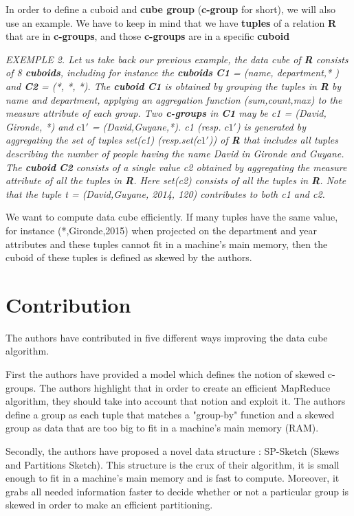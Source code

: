 \documentclass[10pt,journal,compsoc]{IEEEtran}
\begin{document}
In order to define a cuboid and \textbf{cube group} (\textbf{c-group} for short), we will also use an example. We have to keep in mind that we have \textbf{tuples} of a relation \textbf{R} that are in \textbf{c-groups}, and those \textbf{c-groups} are in a specific \textbf{cuboid}

\textit{EXEMPLE 2. Let us take back our previous example, the data cube of \textbf{R} consists of 8 \textbf{cuboids}, including for instance the \textbf{cuboids} \textbf{C1} = (name, department,* ) and \textbf{C2} = (*, *, *). The \textbf{cuboid} \textbf{C1} is obtained by grouping the tuples in \textbf{R} by name
 and department, applying an aggregation function (sum,count,max) to the measure attribute of each group. Two \textbf{c-groups} in \textbf{C1} may be \textit{c1} = (David, Gironde, *) and \textit{$c1 \prime$} = (David,Guyane,*). \textit{c1} (resp. \textit{$c1 \prime$}) is generated by aggregating the set of tuples set(\textit{c1}) (resp.set(\textit{$c1 \prime$})) of \textbf{R} that includes all tuples describing the number of people having the name David in Gironde and Guyane. The \textbf{cuboid} \textbf{C2} consists of a single value \textit{c2} obtained by aggregating the measure attribute of all the tuples
in \textbf{R}. Here set(c2) consists of all the tuples in \textbf{R}. Note
that the tuple t = (David,Guyane, 2014, 120) contributes to both c1 and c2.}

We want to compute data cube efficiently. If many tuples have the same value, for instance (*,Gironde,2015) when projected on the department and year attributes and these tuples cannot fit in a machine's main memory, then the cuboid of these tuples is defined as skewed by the authors.

\section{Contribution}\label{sec:contribution}

The authors have contributed in five different ways improving the data cube algorithm.

First the authors have provided a model which defines the notion of skewed c-groups. The authors highlight that in order to create an efficient MapReduce algorithm, they should take into account that notion and exploit it. The authors define a group as each tuple that matches a "group-by" function and a skewed group as data that are too big to fit in a machine's main memory (RAM).

Secondly, the authors have proposed a novel data structure : SP-Sketch (Skews and Partitions Sketch). This structure is the crux of their algorithm, it is small enough to fit in a machine's main memory and is fast to compute. Moreover, it grabs all needed information faster to decide whether or not a particular group is skewed in order to make an efficient partitioning. 
\end{document}
